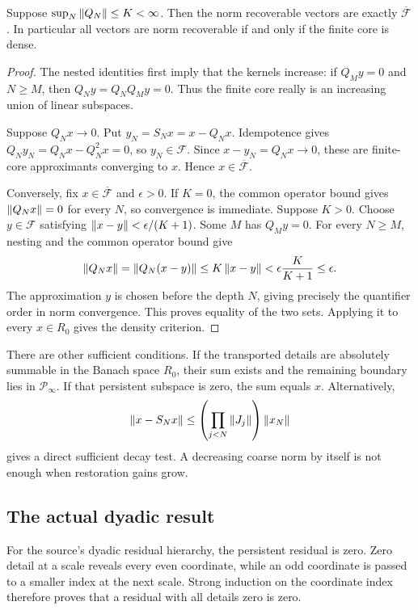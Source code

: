 \begin{theorem}\label{KS27}
Suppose \(\sup_N\left\lVert Q_N\right\rVert\le K<\infty\). Then the norm recoverable vectors are exactly \(\overline{\mathcal F}\). In particular all vectors are norm recoverable if and only if the finite core is dense.
\end{theorem}
\begin{proof}
The nested identities first imply that the kernels increase: if $Q_My=0$ and $N\ge M$, then $Q_Ny=Q_NQ_My=0$. Thus the finite core really is an increasing union of linear subspaces.

Suppose $Q_Nx\to0$. Put $y_N=S_Nx=x-Q_Nx$. Idempotence gives $Q_Ny_N=Q_Nx-Q_N^2x=0$, so $y_N\in\mathcal F$. Since $x-y_N=Q_Nx\to0$, these are finite-core approximants converging to $x$. Hence $x\in\overline{\mathcal F}$.

Conversely, fix $x\in\overline{\mathcal F}$ and $\epsilon>0$. If $K=0$, the common operator bound gives $\left\lVert Q_Nx\right\rVert=0$ for every $N$, so convergence is immediate. Suppose $K>0$. Choose $y\in\mathcal F$ satisfying $\left\lVert x-y\right\rVert<\epsilon/(K+1)$. Some $M$ has $Q_My=0$. For every $N\ge M$, nesting and the common operator bound give
\[
 \left\lVert Q_Nx\right\rVert=\left\lVert Q_N(x-y)\right\rVert\le K\left\lVert x-y\right\rVert
 <\epsilon\frac{K}{K+1}\le\epsilon.
\]
The approximation $y$ is chosen before the depth $N$, giving precisely the quantifier order in norm convergence. This proves equality of the two sets. Applying it to every $x\in R_0$ gives the density criterion.
\end{proof}
There are other sufficient conditions. If the transported details are absolutely summable in the Banach space \(R_0\), their sum exists and the remaining boundary lies in \(\mathcal P_\infty\). If that persistent subspace is zero, the sum equals \(x\). Alternatively,
\[
 \left\lVert x-S_Nx\right\rVert\le\left(\prod_{j<N}\left\lVert J_j\right\rVert\right)\left\lVert x_N\right\rVert
\]
gives a direct sufficient decay test. A decreasing coarse norm by itself is not enough when restoration gains grow.

\subsection{The actual dyadic result}
For the source's dyadic residual hierarchy, the persistent residual is zero. Zero detail at a scale reveals every even coordinate, while an odd coordinate is passed to a smaller index at the next scale. Strong induction on the coordinate index therefore proves that a residual with all details zero is zero.

